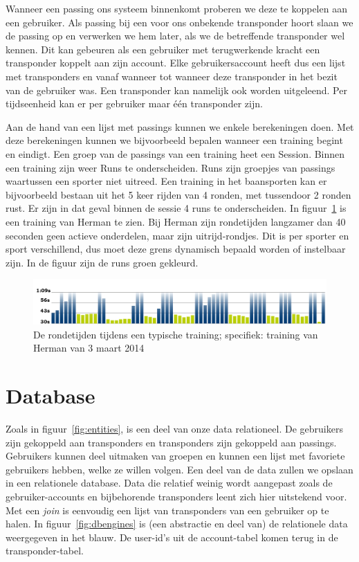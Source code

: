 Wanneer een passing ons systeem binnenkomt proberen we deze te koppelen aan een gebruiker. Als passing bij een voor ons onbekende transponder hoort slaan we de passing op en verwerken we hem later, als we de betreffende transponder wel kennen. Dit kan gebeuren als een gebruiker met terugwerkende kracht een transponder koppelt aan zijn account. Elke gebruikersaccount heeft dus een lijst met transponders en vanaf wanneer tot wanneer deze transponder in het bezit van de gebruiker was. Een transponder kan namelijk ook worden uitgeleend. Per tijdseenheid kan er per gebruiker maar één transponder zijn.

Aan de hand van een lijst met passings kunnen we enkele berekeningen doen. Met deze berekeningen kunnen we bijvoorbeeld bepalen wanneer een training begint en eindigt. Een groep van de passings van een training heet een Session. Binnen een training zijn weer Runs te onderscheiden. Runs zijn groepjes van passings waartussen een sporter niet uitreed. Een training in het baansporten kan er bijvoorbeeld bestaan uit het 5 keer rijden van 4 ronden, met tussendoor 2 ronden rust. Er zijn in dat geval binnen de sessie 4 runs te onderscheiden. In figuur~\ref{fig:sessions} is een training van Herman te zien. Bij Herman zijn rondetijden langzamer dan 40 seconden  geen actieve onderdelen, maar zijn uitrijd-rondjes. Dit is per sporter en sport verschillend, dus moet deze grens dynamisch bepaald worden of instelbaar zijn. In de figuur zijn de runs groen gekleurd.

\begin{figure}
\centering
\includegraphics[width=1\textwidth]{style/images/MyLapsHerman}
\caption{De rondetijden tijdens een typische training; specifiek: training van Herman van 3 maart 2014}
\label{fig:sessions}
\end{figure}

\section{Database}
\label{sec:database}

Zoals in figuur~\ref{fig:entities}, is een deel van onze data relationeel. De gebruikers zijn gekoppeld aan transponders en transponders zijn gekoppeld aan passings. Gebruikers kunnen deel uitmaken van groepen en kunnen een lijst met favoriete gebruikers hebben, welke ze willen volgen. Een deel van de data zullen we opslaan in een relationele database. Data die relatief weinig wordt aangepast zoals de gebruiker-accounts en bijbehorende transponders leent zich hier uitstekend voor. Met een \textit{join} is eenvoudig een lijst van transponders van een gebruiker op te halen. In figuur~\ref{fig:dbengines} is (een abstractie en deel van) de relationele data weergegeven in het blauw. De user-id's uit de account-tabel komen terug in de transponder-tabel.

